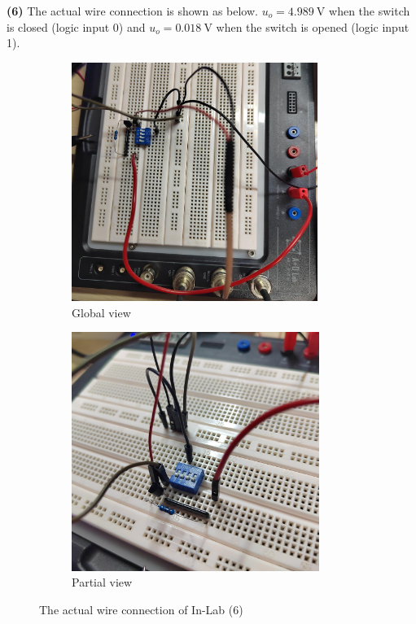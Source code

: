 \documentclass[UTF8]{report}
\theoremstyle{MyLineTheoremStyle} %
\theoremstyle{MyBlockTheoremStyle} %
\theoremstyle{MySubsubsectionStyle} %
\begin{document}
\noindent \textbf{(6) }
The actual wire connection is shown as below.
$u_o = 4.989 \ \mathrm{V}$ when the switch is closed (logic input 0) and $u_o = 0.018 \ \mathrm{V}$ when the switch is opened (logic input 1).

\begin{figure}[H]\centering
\begin{subfigure}[b]{0.5\columnwidth}\centering
    \includegraphics[height=220pt]{assets/Lab1/IMG_20241017_201914.jpg}
    \caption{Global view}
\end{subfigure}\hfill
\begin{subfigure}[b]{0.5\columnwidth}\centering
    \includegraphics[height=220pt]{assets/Lab1/IMG_20241017_201900.jpg}
    \caption{Partial view}
\end{subfigure}
\caption{The actual wire connection of In-Lab (6)}
\end{figure}
\end{document}
